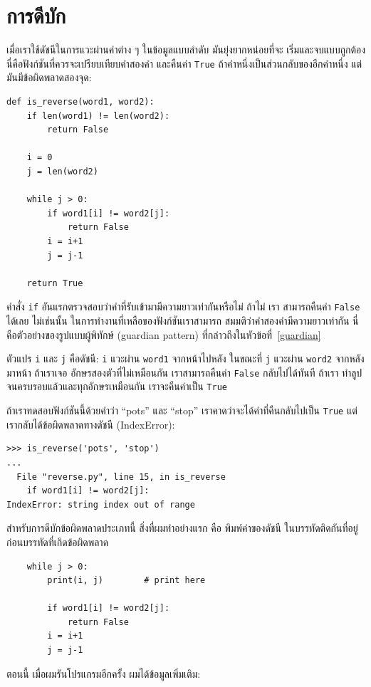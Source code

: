 \section{การดีบัก}

เมื่อเราใช้ดัชนีในการแวะผ่านค่าต่าง ๆ ในข้อมูลแบบลำดับ มันยุ่งยากหน่อยที่จะ
เริ่มและจบแบบถูกต้อง นี่คือฟังก์ชันที่ควรจะเปรียบเทียบคำสองคำ และคืนค่า {\tt True}
ถ้าคำหนึ่งเป็นส่วนกลับของอีกคำหนึ่ง แต่มันมีข้อผิดพลาดสองจุด:

\begin{verbatim}
def is_reverse(word1, word2):
    if len(word1) != len(word2):
        return False
    
    i = 0
    j = len(word2)

    while j > 0:
        if word1[i] != word2[j]:
            return False
        i = i+1
        j = j-1

    return True
\end{verbatim}
%
คำสั่ง {\tt if} อันแรกตรวจสอบว่าคำที่รับเข้ามามีความยาวเท่ากันหรือไม่ ถ้าไม่ เรา
สามารถคืนค่า {\tt False} ได้เลย ไม่เช่นนั้น ในการทำงานที่เหลือของฟังก์ชันเราสามารถ
สมมติว่าคำสองคำมีความยาวเท่ากัน นี่คือตัวอย่างของรูปแบบผู้พิทักษ์ (guardian pattern)
ที่กล่าวถึงในหัวข้อที่~\ref{guardian} 

ตัวแปร {\tt i} และ {\tt j} คือดัชนี:  {\tt i} แวะผ่าน {\tt word1}
จากหน้าไปหลัง ในขณะที่ {\tt j} แวะผ่าน {\tt word2} จากหลังมาหน้า ถ้าเราเจอ
อักษรสองตัวที่ไม่เหมือนกัน เราสามารถคืนค่า {\tt False} กลับไปได้ทันที ถ้าเรา
ทำลูปจนครบรอบแล้วและทุกอักษรเหมือนกัน เราจะคืนค่าเป็น {\tt True}

ถ้าเราทดสอบฟังก์ชันนี้ด้วยคำว่า ``pots'' และ ``stop'' เราคาดว่าจะได้ค่าที่คืนกลับไปเป็น
{\tt True} แต่เรากลับได้ข้อผิดพลาดทางดัชนี (IndexError): 

\begin{verbatim}
>>> is_reverse('pots', 'stop')
...
  File "reverse.py", line 15, in is_reverse
    if word1[i] != word2[j]:
IndexError: string index out of range
\end{verbatim}
%
สำหรับการดีบักข้อผิดพลาดประเภทนี้ สิ่งที่ผมทำอย่างแรก คือ พิมพ์ค่าของดัชนี
ในบรรทัดติดกันที่อยู่ก่อนบรรทัดที่เกิดข้อผิดพลาด

\begin{verbatim}
    while j > 0:
        print(i, j)        # print here
        
        if word1[i] != word2[j]:
            return False
        i = i+1
        j = j-1
\end{verbatim}
%
ตอนนี้ เมื่อผมรันโปรแกรมอีกครั้ง ผมได้ข้อมูลเพิ่มเติม:


